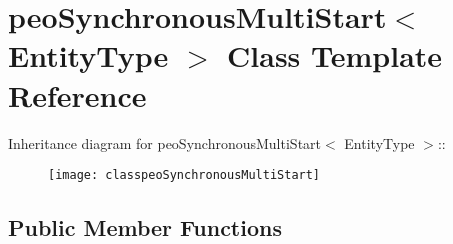 \hypertarget{classpeoSynchronousMultiStart}{
\section{peo\-Synchronous\-Multi\-Start$<$ Entity\-Type $>$ Class Template Reference}
\label{classpeoSynchronousMultiStart}
}
Inheritance diagram for peo\-Synchronous\-Multi\-Start$<$ Entity\-Type $>$::\begin{figure}[H]
\begin{center}
\leavevmode
\texttt{[image: classpeoSynchronousMultiStart]}
\end{center}
\end{figure}
\subsection*{Public Member Functions}

